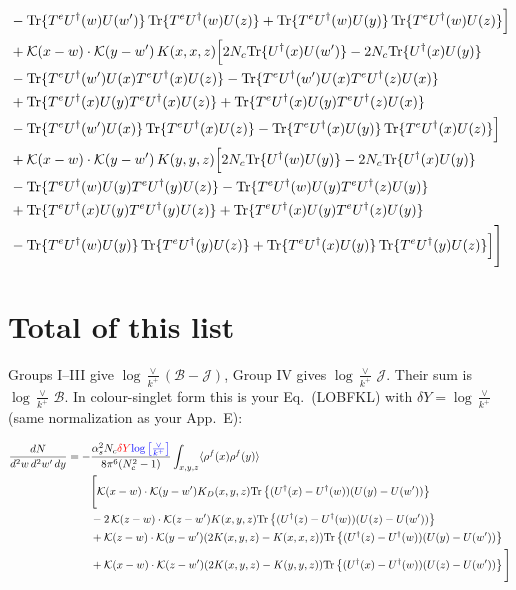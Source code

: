 \documentclass[9pt]{article}
\newcommand{\old}[1]{{\color{red}#1}}
\newcommand{\new}[1]{{\color{blue}#1}}
\numberwithin{equation}{section}
\begin{document}
{\begin{align}
&-{\rm Tr}\{T^eU^\dagger(w)U(w')\}\,{\rm Tr}\{T^eU^\dagger(w)U(z)\}+{\rm Tr}\{T^eU^\dagger(w)U(y)\}\,{\rm Tr}\{T^eU^\dagger(w)U(z)\}\Big]\notag\\
&+\mathcal K(x-w)\cdot\mathcal K(y-w')\,K(x,x,z)\Big[2 N_c{\rm Tr}\{U^\dagger(x)U(w')\}-2 N_c{\rm Tr}\{U^\dagger(x)U(y)\}\notag\\
&-{\rm Tr}\{T^eU^\dagger(w')U(x)T^eU^\dagger(x)U(z)\}-{\rm Tr}\{T^eU^\dagger(w')U(x)T^eU^\dagger(z)U(x)\}\notag\\
&+{\rm Tr}\{T^eU^\dagger(x)U(y)T^eU^\dagger(x)U(z)\}+{\rm Tr}\{T^eU^\dagger(x)U(y)T^eU^\dagger(z)U(x)\}\notag\\
&-{\rm Tr}\{T^eU^\dagger(w')U(x)\}\,{\rm Tr}\{T^eU^\dagger(x)U(z)\}-{\rm Tr}\{T^eU^\dagger(x)U(y)\}\,{\rm Tr}\{T^eU^\dagger(x)U(z)\}\Big]\notag\\
&+\mathcal K(x-w)\cdot\mathcal K(y-w')\,K(y,y,z)\Big[2 N_c{\rm Tr}\{U^\dagger(w)U(y)\}-2 N_c{\rm Tr}\{U^\dagger(x)U(y)\}\notag\\
&-{\rm Tr}\{T^eU^\dagger(w)U(y)T^eU^\dagger(y)U(z)\}-{\rm Tr}\{T^eU^\dagger(w)U(y)T^eU^\dagger(z)U(y)\}\notag\\
&+{\rm Tr}\{T^eU^\dagger(x)U(y)T^eU^\dagger(y)U(z)\}+{\rm Tr}\{T^eU^\dagger(x)U(y)T^eU^\dagger(z)U(y)\}\notag\\
&-{\rm Tr}\{T^eU^\dagger(w)U(y)\}\,{\rm Tr}\{T^eU^\dagger(y)U(z)\}+{\rm Tr}\{T^eU^\dagger(x)U(y)\}\,{\rm Tr}\{T^eU^\dagger(y)U(z)\}\Big]\Bigg]
\end{align}}

\section{\new{Total of this list}}
\new{Groups I--III give $\log\frac{\vee}{k^+}(\mathcal B-\mathcal J)$, Group IV gives $\log\frac{\vee}{k^+}\,\mathcal J$. Their sum is $\log\frac{\vee}{k^+}\,\mathcal B$. In colour-singlet form this is your Eq.~(LOBFKL) with $\delta Y=\log\frac{\vee}{k^+}$ (same normalization as your App.~E):}

\begin{align}
    \frac{dN}{d^2 w\, d^2 w'\, dy}= - &\frac{\alpha_{s}^2 N_c  \old{\delta Y}\new{\log\big[\frac{\vee}{k^+}\big]} }{8\pi^{6} (N_c^2-1)}
    \int_{x,y,z} \langle \rho^f(x) \rho^f(y)\rangle
    \notag \\ &
    \Bigg[
    {\cal K} (x-w) \cdot {\cal K} (y-w') K_D(x,y,z) {\rm Tr} \left \{  (U^\dagger(x)-U^\dagger(w)) (U(y)-U(w')) \right\}
    \notag \\ &
    -2\, {\cal K} (z-w) \cdot {\cal K} (z-w') K(x,y,z) {\rm Tr} \left \{  (U^\dagger(z)-U^\dagger(w)) (U(z)-U(w')) \right\}
    \notag \\ &
    +
    {\cal K} (z-w) \cdot {\cal K} (y-w') (2K(x,y,z) - K(x,x,z)) {\rm Tr} \left \{  (U^\dagger(z)-U^\dagger(w)) (U(y)-U(w')) \right\}
    \notag \\ &
    +
    {\cal K} (x-w) \cdot {\cal K} (z-w') (2K(x,y,z) - K(y,y,z)) {\rm Tr} \left \{  (U^\dagger(x)-U^\dagger(w)) (U(z)-U(w')) \right\}
    \Bigg]
\label{eq:LOBFKL}
\end{align}
\end{document}
